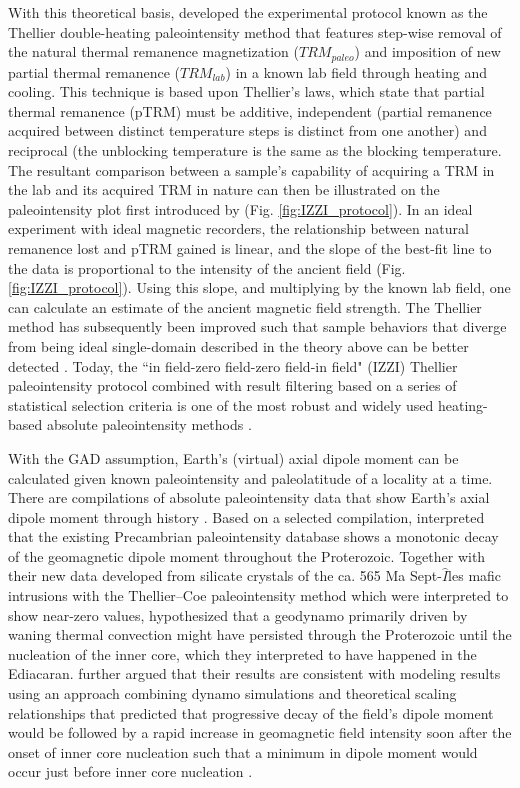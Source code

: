 With this theoretical basis, \cite{Thellier1959a} developed the experimental protocol known as the Thellier double-heating paleointensity method that features step-wise removal of the natural thermal remanence magnetization ($TRM_{paleo}$) and imposition of new partial thermal remanence ($TRM_{lab}$) in a known lab field through heating and cooling. This technique is based upon Thellier’s laws, which state that partial thermal remanence (pTRM) must be additive, independent (partial remanence acquired between distinct temperature steps is distinct from one another) and reciprocal (the unblocking temperature is the same as the blocking temperature. The resultant comparison between a sample's capability of acquiring a TRM in the lab and its acquired TRM in nature can then be illustrated on the paleointensity plot first introduced by \cite{Arai1963a} (Fig. \ref{fig:IZZI_protocol}). In an ideal experiment with ideal magnetic recorders, the relationship between natural remanence lost and pTRM gained is linear, and the slope of the best-fit line to the data is proportional to the intensity of the ancient field (Fig. \ref{fig:IZZI_protocol}). Using this slope, and multiplying by the known lab field, one can calculate an estimate of the ancient magnetic field strength. The Thellier method has subsequently been improved such that sample behaviors that diverge from being ideal single-domain described in the theory above can be better detected \citep[e.g.][]{Coe1967b, Riisager2001a, Yu2003a, Yu2004a, Yu2006a}. Today, the ``in field-zero field-zero field-in field" (IZZI) Thellier paleointensity protocol combined with result filtering based on a series of statistical selection criteria is one of the most robust and widely used heating-based absolute paleointensity methods \citep{Yu2004a}. 

With the GAD assumption, Earth's (virtual) axial dipole moment can be calculated given known paleointensity and paleolatitude of a locality at a time. There are compilations of absolute paleointensity data that show Earth's axial dipole moment through history \citep[e.g.][]{Veikkolainen2014b, Bono2022b}. Based on a selected compilation, \cite{Bono2019a} interpreted that the existing Precambrian paleointensity database shows a monotonic decay of the geomagnetic dipole moment throughout the Proterozoic. Together with their new data developed from silicate crystals of the ca. 565 Ma Sept-$\hat{I}$les mafic intrusions with the Thellier–Coe paleointensity method which were interpreted to show near-zero values, \cite{Bono2019a} hypothesized that a geodynamo primarily driven by waning thermal convection might have persisted through the Proterozoic until the nucleation of the inner core, which they interpreted to have happened in the Ediacaran. \cite{Bono2019a} further argued that their results are consistent with modeling results using an approach combining dynamo simulations and theoretical scaling relationships that predicted that progressive decay of the field’s dipole moment would be followed by a rapid increase in geomagnetic field intensity soon after the onset of inner core nucleation such that a minimum in dipole moment would occur just before inner core nucleation \citep{Driscoll2016a}. 


